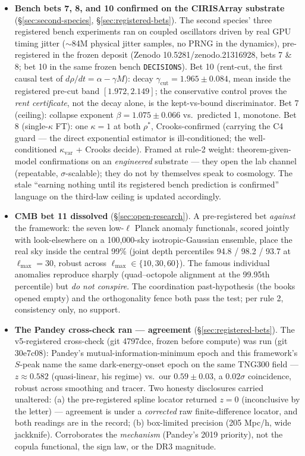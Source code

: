 \documentclass[11pt,a4paper]{article}
\begin{document}
\begin{itemize}[leftmargin=*,itemsep=0.5em]
\item \textbf{Bench bets 7, 8, and 10 confirmed on the CIRISArray substrate} (\S\ref{sec:second-species}, \S\ref{sec:registered-bets}). The second species' three registered bench experiments ran on coupled oscillators driven by real GPU timing jitter ($\sim$84M physical jitter samples, no PRNG in the dynamics), pre-registered in the frozen deposit (Zenodo 10.5281/zenodo.21316928, bets 7 \& 8; bet 10 in the same frozen bench \texttt{DECISIONS}). Bet 10 (rent-cut, the first causal test of $d\rho/dt = \alpha - \gamma M$): decay $\gamma_{\text{cut}} = 1.965 \pm 0.084$, mean inside the registered pre-cut band $[1.972, 2.149]$; the conservative control proves the \emph{rent certificate}, not the decay alone, is the kept-vs-bound discriminator. Bet 7 (ceiling): collapse exponent $\beta = 1.075 \pm 0.066$ vs.\ predicted 1, monotone. Bet 8 (single-$\kappa$ FT): one $\kappa = 1$ at both $\rho^*$, Crooks-confirmed (carrying the C4 guard --- the direct exponential estimator is ill-conditioned; the well-conditioned $\kappa_{\text{var}}$ + Crooks decide). Framed at rule-2 weight: theorem-given-model confirmations on an \emph{engineered} substrate --- they open the lab channel (repeatable, $\sigma$-scalable); they do not by themselves speak to cosmology. The stale ``earning nothing until its registered bench prediction is confirmed'' language on the third-law ceiling is updated accordingly.
\item \textbf{CMB bet 11 dissolved} (\S\ref{sec:open-research}). A pre-registered bet \emph{against} the framework: the seven low-$\ell$ Planck anomaly functionals, scored jointly with look-elsewhere on a 100{,}000-sky isotropic-Gaussian ensemble, place the real sky inside the central 99\% (joint depth percentiles 94.8 / 98.2 / 93.7 at $\ell_{\max}=30$, robust across $\ell_{\max}\in\{10,30,60\}$). The famous individual anomalies reproduce sharply (quad--octopole alignment at the 99.95th percentile) but \emph{do not conspire}. The coordination past-hypothesis (the books opened empty) and the orthogonality fence both pass the test; per rule 2, consistency only, no support.
\item \textbf{The Pandey cross-check ran --- agreement} (\S\ref{sec:registered-bets}). The v5-registered cross-check (git 4797dce, frozen before compute) was run (git 30e7c08): Pandey's mutual-information-minimum epoch and this framework's $S$-peak name the same dark-energy-onset epoch on the same TNG300 field --- $z \approx 0.582$ (quasi-linear, his regime) vs.\ our $0.59 \pm 0.03$, a $0.02\sigma$ coincidence, robust across smoothing and tracer. Two honesty disclosures carried unaltered: (a) the pre-registered spline locator returned $z=0$ (inconclusive by the letter) --- agreement is under a \emph{corrected} raw finite-difference locator, and both readings are in the record; (b) box-limited precision (205 Mpc/h, wide jackknife). Corroborates the \emph{mechanism} (Pandey's 2019 priority), not the copula functional, the sign law, or the DR3 magnitude.
\end{itemize}
\end{document}
